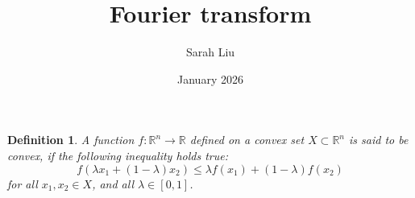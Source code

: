 \documentclass{article}
\title{Fourier transform}
\author{Sarah Liu}
\date{January 2026}
\newtheorem{definition}{Definition}[section]
\theoremstyle{definition}
\begin{document}
\maketitle

\begin{definition}
A function $f : \mathbb{R}^n\rightarrow \mathbb{R}$ deﬁned on a convex set $X \subset \mathbb{R}^n$ is said to be convex, if the following inequality holds true:
\[
f(\lambda x_1 + (1-\lambda) x_2)\leq \lambda f(x_1)+(1-\lambda)f(x_2)
\]
for all $x_1,x_2\in X$, and all $\lambda \in [0, 1]$.
\end{definition}
\end{document}

